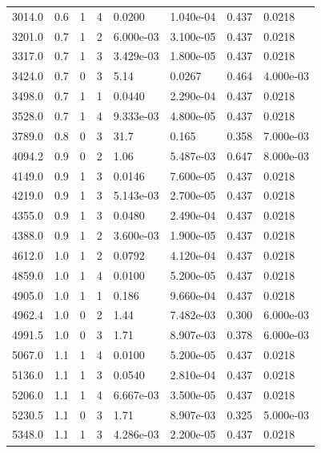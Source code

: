 \documentclass[preview]{standalone}
\begin{document}
{{\begin{tabular}{L{1.2cm}C{1.2cm} C{0.3cm}C{0.5cm} C{1.4cm}C{1.4cm} C{1.4cm}C{1.4cm}}
  3014.0  &   0.6  & 1     &  4 &  0.0200  & 1.040e-04  & 0.437 &  0.0218   \\ 
  3201.0  &   0.7  & 1     &  2 &  6.000e-03  & 3.100e-05  & 0.437 &  0.0218   \\ 
  3317.0  &   0.7  & 1     &  3 &  3.429e-03  & 1.800e-05  & 0.437 &  0.0218   \\ 
  3424.0  &   0.7  & 0     &  3 &  5.14  & 0.0267  & 0.464 &  4.000e-03   \\ 
  3498.0  &   0.7  & 1     &  1 &  0.0440  & 2.290e-04  & 0.437 &  0.0218   \\ 
  3528.0  &   0.7  & 1     &  4 &  9.333e-03  & 4.800e-05  & 0.437 &  0.0218   \\ 
  3789.0  &   0.8  & 0     &  3 &  31.7  & 0.165  & 0.358 &  7.000e-03   \\ 
  4094.2  &   0.9  & 0     &  2 &  1.06  & 5.487e-03  & 0.647 &  8.000e-03   \\ 
  4149.0  &   0.9  & 1     &  3 &  0.0146  & 7.600e-05  & 0.437 &  0.0218   \\ 
  4219.0  &   0.9  & 1     &  3 &  5.143e-03  & 2.700e-05  & 0.437 &  0.0218   \\ 
  4355.0  &   0.9  & 1     &  3 &  0.0480  & 2.490e-04  & 0.437 &  0.0218   \\ 
  4388.0  &   0.9  & 1     &  2 &  3.600e-03  & 1.900e-05  & 0.437 &  0.0218   \\ 
  4612.0  &   1.0  & 1     &  2 &  0.0792  & 4.120e-04  & 0.437 &  0.0218   \\ 
  4859.0  &   1.0  & 1     &  4 &  0.0100  & 5.200e-05  & 0.437 &  0.0218   \\ 
  4905.0  &   1.0  & 1     &  1 &  0.186  & 9.660e-04  & 0.437 &  0.0218   \\ 
  4962.4  &   1.0  & 0     &  2 &  1.44  & 7.482e-03  & 0.300 &  6.000e-03   \\ 
  4991.5  &   1.0  & 0     &  3 &  1.71  & 8.907e-03  & 0.378 &  6.000e-03   \\ 
  5067.0  &   1.1  & 1     &  4 &  0.0100  & 5.200e-05  & 0.437 &  0.0218   \\ 
  5136.0  &   1.1  & 1     &  3 &  0.0540  & 2.810e-04  & 0.437 &  0.0218   \\ 
  5206.0  &   1.1  & 1     &  4 &  6.667e-03  & 3.500e-05  & 0.437 &  0.0218   \\ 
  5230.5  &   1.1  & 0     &  3 &  1.71  & 8.907e-03  & 0.325 &  5.000e-03   \\ 
  5348.0  &   1.1  & 1     &  3 &  4.286e-03  & 2.200e-05  & 0.437 &  0.0218   \\ 

\end{tabular}}}
\end{document}
